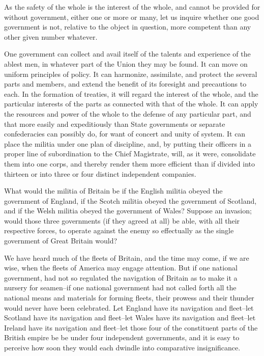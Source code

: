 As the safety of the whole is the interest of the whole, and cannot be provided for without government, either one or more or many, let us inquire whether one good government is not, relative to the object in question, more competent than any other given number whatever.

One government can collect and avail itself of the talents and experience of the ablest men, in whatever part of the Union they may be found. 
It can move on uniform principles of policy. 
It can harmonize, assimilate, and protect the several parts and members, and extend the benefit of its foresight and precautions to each. 
In the formation of treaties, it will regard the interest of the whole, and the particular interests of the parts as connected with that of the whole. 
It can apply the resources and power of the whole to the defense of any particular part, and that more easily and expeditiously than State governments or separate confederacies can possibly do, for want of concert and unity of system. 
It can place the militia under one plan of discipline, and, by putting their officers in a proper line of subordination to the Chief Magistrate, will, as it were, consolidate them into one corps, and thereby render them more efficient than if divided into thirteen or into three or four distinct independent companies.

What would the militia of Britain be if the English militia obeyed the government of England, if the Scotch militia obeyed the government of Scotland, and if the Welsh militia obeyed the government of Wales? 
Suppose an invasion; would those three governments (if they agreed at all) be able, with all their respective forces, to operate against the enemy so effectually as the single government of Great Britain would?

We have heard much of the fleets of Britain, and the time may come, if we are wise, when the fleets of America may engage attention. 
But if one national government, had not so regulated the navigation of Britain as to make it a nursery for seamen--if one national government had not called forth all the national means and materials for forming fleets, their prowess and their thunder would never have been celebrated. 
Let England have its navigation and fleet--let Scotland have its navigation and fleet--let Wales have its navigation and fleet--let Ireland have its navigation and fleet--let those four of the constituent parts of the British empire be be under four independent governments, and it is easy to perceive how soon they would each dwindle into comparative insignificance.


